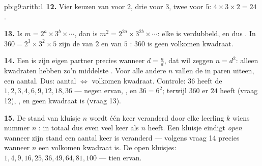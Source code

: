 \begin{solution}{pb:g9:arith:1}
\textbf{12.} Vier keuzen van  voor $2$, drie voor $3$, twee voor $5$:
$4 \times 3 \times 2 = 24$ .

\textbf{13.} Is $m = 2^{a} \times 3^{b} \times \cdots$, dan is
$m^2 = 2^{2a} \times 3^{2b} \times \cdots$: elke  is verdubbeld, en dus
. In $360 = 2^3 \times 3^2 \times 5$ zijn de  van $2$ en van $5$
: $360$ is geen volkomen kwadraat.

\textbf{14.} Een  is zijn eigen partner precies wanneer $d = \frac nd$, dat
wil zeggen $n = d^2$: alleen kwadraten hebben zo'n middelste . Voor alle
andere $n$ vallen de  in paren uiteen, een  aantal. Dus:  aantal
 $\Leftrightarrow$ volkomen kwadraat. Controle: $36$ heeft de 
$1, 2, 3, 4, 6, 9, 12, 18, 36$ --- negen ervan, , en $36 = 6^2$; terwijl
$360$ er $24$ heeft (vraag 12), , en geen kwadraat is (vraag 13).

\textbf{15.} De stand van kluisje $n$ wordt één keer veranderd door elke leerling
$k$ wiens nummer $n$ : in totaal dus even veel keer als $n$  heeft.
Een kluisje eindigt \emph{open} wanneer zijn stand een  aantal keer is
veranderd --- volgens vraag 14 precies wanneer $n$ een volkomen kwadraat is. De
open kluisjes: $1, 4, 9, 16, 25, 36, 49, 64, 81, 100$ --- tien ervan.
\end{solution}
